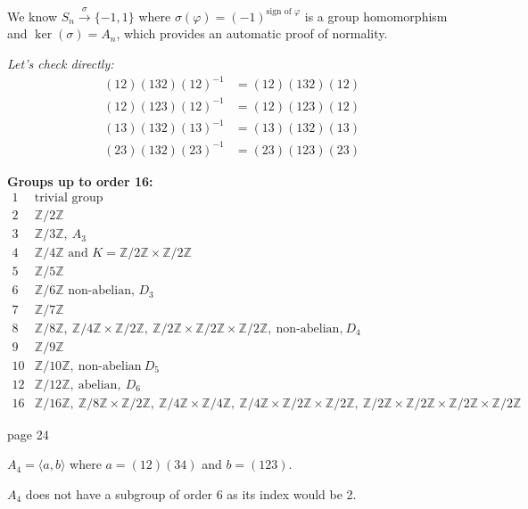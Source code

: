 \documentclass{article}
\begin{document}
We know $S_n \overset{\sigma}{\to} \{-1, 1\}$ where $\sigma(\varphi) = (-1)^{\text{sign of } \varphi}$ is a group homomorphism and $\ker(\sigma) = A_n$, which provides an automatic proof of normality.

\textit{Let's check directly:}
\[
\begin{aligned}
    (12)(132)(12)^{-1} &= (12)(132)(12) \\
    (12)(123)(12)^{-1} &= (12)(123)(12) \\
    (13)(132)(13)^{-1} &= (13)(132)(13) \\
    (23)(132)(23)^{-1} &= (23)(123)(23)
\end{aligned}
\]

\textbf{Groups up to order 16:}
\[
\begin{array}{ll}
1 & \text{trivial group} \\
2 & \mathbb{Z}/2\mathbb{Z} \\
3 & \mathbb{Z}/3\mathbb{Z}, \ A_3 \\
4 & \mathbb{Z}/4\mathbb{Z} \text{ and } K = \mathbb{Z}/2\mathbb{Z} \times \mathbb{Z}/2\mathbb{Z} \\
5 & \mathbb{Z}/5\mathbb{Z} \\
6 & \mathbb{Z}/6\mathbb{Z} \text{ non-abelian, } D_3 \\
7 & \mathbb{Z}/7\mathbb{Z} \\
8 & \mathbb{Z}/8\mathbb{Z}, \ \mathbb{Z}/4\mathbb{Z} \times \mathbb{Z}/2\mathbb{Z}, \ \mathbb{Z}/2\mathbb{Z} \times \mathbb{Z}/2\mathbb{Z} \times \mathbb{Z}/2\mathbb{Z}, \ \text{non-abelian,} \ D_4 \\
9 & \mathbb{Z}/9\mathbb{Z} \\
10 & \mathbb{Z}/10\mathbb{Z}, \ \text{non-abelian} \ D_5 \\
12 & \mathbb{Z}/12\mathbb{Z}, \ \text{abelian}, \ D_6 \\
16 & \mathbb{Z}/16\mathbb{Z}, \ \mathbb{Z}/8\mathbb{Z} \times \mathbb{Z}/2\mathbb{Z}, \ \mathbb{Z}/4\mathbb{Z} \times \mathbb{Z}/4\mathbb{Z}, \ \mathbb{Z}/4\mathbb{Z} \times \mathbb{Z}/2\mathbb{Z} \times \mathbb{Z}/2\mathbb{Z}, \ \mathbb{Z}/2\mathbb{Z} \times \mathbb{Z}/2\mathbb{Z} \times \mathbb{Z}/2\mathbb{Z} \times \mathbb{Z}/2\mathbb{Z}
\end{array}
\]

\newpage
\noindent page 24

$A_4 = \langle a, b \rangle$ where $a = (12)(34)$ and $b = (123)$.

$A_4$ does not have a subgroup of order 6 as its index would be 2.
\end{document}
